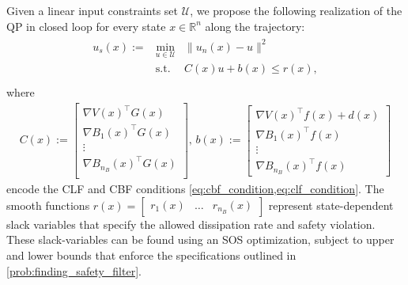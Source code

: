 \documentclass[lettersize,journal]{IEEEtran}
\newcommand{\R}{\mathbb{R}}
\newcommand{\afterReviewChangedBox}[1]{{\color{orange}#1}}
\begin{document}
Given a linear input constraints set $\mathcal U$, we propose the following realization of the QP in closed loop for every state $x \in \R^n$ along the trajectory:
\begin{align} \label{eq:qcqp_based_controller}
   \begin{array}{llll}
      u_s(x) := &\underset{u \in \mathcal U}{\mbox{min}} & \| u_n(x) - u \|^2 \\
      &\mbox{s.t.} & C(x) u + b(x) \leq r(x), \\
   \end{array}
\end{align}
where
\begin{subequations} \label{eq:qcqp_based_controller_constraints}
   \begin{align}
      C(x) := \left[\begin{smallmatrix}
         \nabla V(x)^\top G(x) \\
         \nabla B_1(x)^\top G(x) \\
         \vdots \\
         \nabla B_{n_{\!B}}(x)^\top G(x) \\
      \end{smallmatrix} \right], \,
      b(x) := \left[ \begin{smallmatrix}
         \nabla V(x)^\top f(x) + d(x) \\
         \nabla B_1(x)^\top f(x) \\
         \vdots \\
         \nabla B_{n_{\!B}}(x)^\top f(x)
      \end{smallmatrix} \right]
   \end{align}
\end{subequations}
encode the CLF and CBF conditions \cref{eq:cbf_condition,eq:clf_condition}.
\afterReviewChangedBox{The smooth functions $r(x) = [\begin{matrix} r_1(x) & \hdots & r_{n_{\!B}}(x) \end{matrix}]$ represent state-dependent slack variables that specify the allowed dissipation rate and safety violation.
These slack-variables can be found using an SOS optimization, subject to upper and lower bounds that enforce the specifications outlined in \cref{prob:finding_safety_filter}.}
\end{document}
